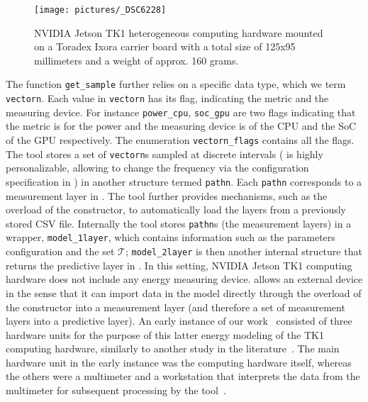 \begin{figure}[h!]
  \centering 
  \texttt{[image: pictures/\_DSC6228]}
  \caption[NVIDIA Jetson TK1 heterogeneous computing hardware]{NVIDIA Jetson TK1 heterogeneous computing hardware mounted on a Toradex Ixora carrier board with a total size of 125x95 millimeters and a weight of approx. 160 grams.} 
  \label{fig:tk1}
\end{figure}
The function {\small\tt get\_sample} further relies on a specific data type, which we term {\small\tt vectorn}. Each value in {\small\tt vectorn} has its flag, indicating the metric and the measuring device. For instance {\small\tt power\_cpu}, {\small\tt soc\_gpu} are two flags indicating that the metric is for the power and the measuring device is of the CPU and the SoC of the GPU respectively. The enumeration {\small\tt vectorn\_flags} contains all the flags. The tool stores a set of {\small\tt vectorn}s sampled at discrete intervals (\powprof{} is highly personalizable, allowing to change the frequency via the configuration specification in ) in another structure termed {\small\tt pathn}. Each {\small\tt pathn} corresponds to a measurement layer in . The tool further provides mechanisms, such as the overload of the constructor, to automatically load the layers from a previously stored CSV file. Internally the tool stores {\small\tt pathn}s (the measurement layers) in a wrapper, {\small\tt model\_1layer}, which contains information such as the parameters configuration and the set $\mathcal{T}$; {\small\tt model\_2layer} is then another internal structure that returns the predictive layer in . In this setting, NVIDIA Jetson TK1 computing hardware does not include any energy measuring device. \powprof{} allows an external device in the sense that it can import data in the model directly through the overload of the constructor into a measurement layer (and therefore a set of measurement layers into a predictive layer). An early instance of our work~\citep{seewald2019hlpgpu} consisted of three hardware units for the purpose of this latter energy modeling of the TK1 computing hardware, similarly to another study in the literature~\citep{calore2015energy}. The main hardware unit in the early instance was the computing hardware itself, whereas the others were a multimeter and a workstation that interprets the data from the multimeter for subsequent processing by the tool~\citep{seewald2019coarse}.

